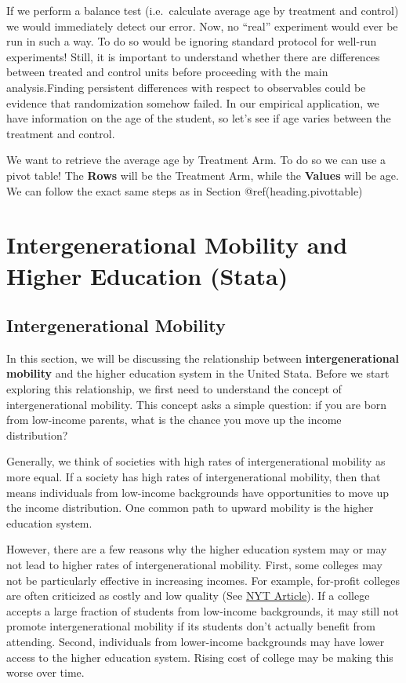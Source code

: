 \documentclass[
]{book}
\begin{document}
If we perform a balance test (i.e.~calculate average age by treatment and control) we would immediately detect our error. Now, no ``real'' experiment would ever be run in such a way. To do so would be ignoring standard protocol for well-run experiments! Still, it is important to understand whether there are differences between treated and control units before proceeding with the main analysis.Finding persistent differences with respect to observables could be evidence that randomization somehow failed. In our empirical application, we have information on the age of the student, so let's see if age varies between the treatment and control.

We want to retrieve the average age by Treatment Arm. To do so we can use a pivot table! The \textbf{Rows} will be the Treatment Arm, while the \textbf{Values} will be age. We can follow the exact same steps as in Section @ref(heading.pivottable)

\hypertarget{intergenerational-mobility-and-higher-education-stata}{%
\chapter{Intergenerational Mobility and Higher Education (Stata)}\label{intergenerational-mobility-and-higher-education-stata}}

\hypertarget{intergenerational-mobility}{%
\section{Intergenerational Mobility}\label{intergenerational-mobility}}

In this section, we will be discussing the relationship between \textbf{intergenerational mobility} and the higher education system in the United Stata. Before we start exploring this relationship, we first need to understand the concept of intergenerational mobility. This concept asks a simple question: if you are born from low-income parents, what is the chance you move up the income distribution?

Generally, we think of societies with high rates of intergenerational mobility as more equal. If a society has high rates of intergenerational mobility, then that means individuals from low-income backgrounds have opportunities to move up the income distribution. One common path to upward mobility is the higher education system.

However, there are a few reasons why the higher education system may or may not lead to higher rates of intergenerational mobility. First, some colleges may not be particularly effective in increasing incomes. For example, for-profit colleges are often criticized as costly and low quality (See \href{https://www.nytimes.com/2020/06/17/business/coronavirus-for-profit-colleges.html}{NYT Article}). If a college accepts a large fraction of students from low-income backgrounds, it may still not promote intergenerational mobility if its students don't actually benefit from attending. Second, individuals from lower-income backgrounds may have lower access to the higher education system. Rising cost of college may be making this worse over time.
\end{document}
